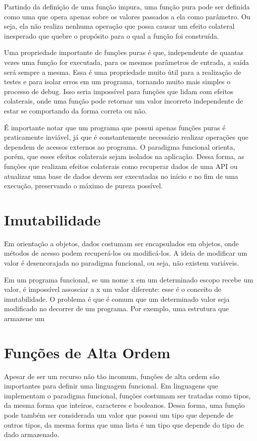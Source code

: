 Partindo da definição de uma função impura, uma função pura 
pode ser definida como uma que opera apenas sobre os valores 
passados a ela como parâmetro. Ou seja, ela não realiza 
nenhuma operação que possa causar um efeito colateral 
inesperado que quebre o propósito para o qual a função foi 
construída.

Uma propriedade importante de funções puras é que, 
independente de quantas vezes uma função for executada, 
para os mesmos parâmetros de entrada, a saída será sempre 
a mesma. Essa é uma propriedade muito útil para a realização 
de testes e para isolar erros em um programa, tornando muito 
mais simples o processo de debug. Isso seria impossível para 
funções que lidam com efeitos colaterais, onde uma função 
pode retornar um valor incorreto independente de estar se 
comportando da forma correta ou não.

É importante notar que um programa que possui apenas funções 
puras é praticamente inviável, já que é constantemente 
necessário realizar operações que dependem de acessos 
externos ao programa. O paradigma funcional orienta, porém, 
que esses efeitos colaterais sejam isolados na aplicação. 
Dessa forma, as funções que realizam efeitos colaterais como 
recuperar dados de uma API ou atualizar uma base de dados 
devem ser executadas no início e no fim de uma execução, 
preservando o máximo de pureza possível.

\section{Imutabilidade}

Em orientação a objetos, dados costumam ser encapsulados em 
objetos, onde métodos de acesso podem recuperá-los ou 
modificá-los. A ideia de modificar um valor é desencorajada 
no paradigma funcional, ou seja, não existem variáveis.

Em um programa funcional, se um nome x em um determinado 
escopo recebe um valor, é impossível assosciar a x um 
valor diferente: esse é o conceito de imutabilidade. O 
problema é que é comum que um determinado valor seja 
modificado no decorrer de um programa. Por exemplo, uma 
estrutura que armazene um 

\section{Funções de Alta Ordem}

Apesar de ser um recurso não tão incomum, funções de alta 
ordem são importantes para definir uma linguagem funcional. 
Em linguagens que implementam o paradigma funcional, funções 
costumam ser tratadas como tipos, da mesma forma que inteiros, 
caracteres e booleanos. Dessa forma, uma função pode também 
ser considerada um valor que possui um tipo que depende de 
outros tipos, da mesma forma que uma lista é um tipo que 
depende do tipo de dado armazenado.

